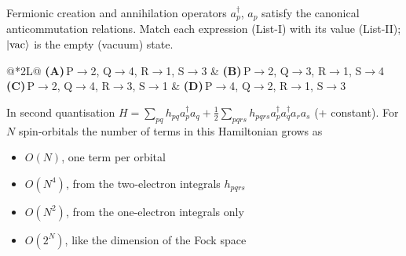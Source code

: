 \documentclass[11pt,a4paper]{article}
\newcommand{\optlabel}[1]{\textbf{(#1)}}
\newenvironment{qitem}[1]{\begin{list}{}{\setlength{\leftmargin}{3.3em}\setlength{\labelwidth}{3.1em}%
  \setlength{\labelsep}{0.2em}\setlength{\topsep}{3pt}\setlength{\parsep}{3pt}}\item[\textbf{Q.#1}\hfill]}{\end{list}}
\newcommand{\qsep}{\par\vspace{2pt}{\color{black!15}\hrule}\vspace{4pt}}
\begin{document}
\begin{qitem}{11}
Fermionic creation and annihilation operators $a_p^\dagger$, $a_p$ satisfy the canonical anticommutation relations. Match each expression
(List-I) with its value (List-II); $\ket{\mathrm{vac}}$ is the empty (vacuum) state.
\par\smallskip{}
\par\smallskip\noindent\begin{tabularx}{\linewidth}{@{}*{2}{L}@{}}
\optlabel{A}\,P$\to$2, Q$\to$4, R$\to$1, S$\to$3 & \optlabel{B}\,P$\to$2, Q$\to$3, R$\to$1, S$\to$4 \\[3pt]
\optlabel{C}\,P$\to$2, Q$\to$4, R$\to$3, S$\to$1 & \optlabel{D}\,P$\to$4, Q$\to$2, R$\to$1, S$\to$3
\end{tabularx}
\end{qitem}
\qsep

\begin{qitem}{12}
In second quantisation $H = \sum_{pq}h_{pq}a_p^\dagger a_q + \tfrac12\sum_{pqrs}h_{pqrs}a_p^\dagger a_q^\dagger a_ra_s$ (+ constant). For $N$ spin-orbitals the number of
terms in this Hamiltonian grows as
\begin{itemize}[leftmargin=2.6em, labelsep=0.4em, itemsep=2pt, topsep=3pt]
\item[\optlabel{A}] $O(N)$, one term per orbital
\item[\optlabel{B}] $O(N^4)$, from the two-electron integrals $h_{pqrs}$
\item[\optlabel{C}] $O(N^2)$, from the one-electron integrals only
\item[\optlabel{D}] $O(2^N)$, like the dimension of the Fock space
\end{itemize}
\end{qitem}
\qsep
\end{document}
